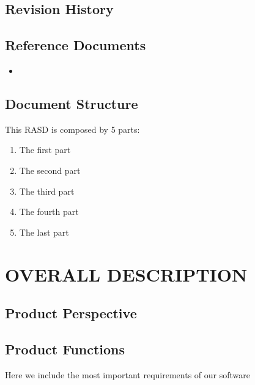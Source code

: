 \documentclass[a4paper,leqno]{book}
\begin{document}
\section{Revision History}

\section{Reference Documents}
\begin{itemize}
	\item 
\end{itemize}

\section{Document Structure}
This RASD is composed by 5 parts:
\begin{enumerate}
	\item The first part
	\item The second part
	\item The third part
	\item  The fourth part
	\item  The last part
\end{enumerate}

\chapter{OVERALL DESCRIPTION}
\section{Product Perspective}


\section{Product Functions}
Here we include the most important requirements of our software
\end{document}
